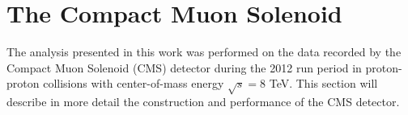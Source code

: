 
\section{The Compact Muon Solenoid}\label{sec:CMS}

The analysis presented in this work was performed on the data recorded by the Compact Muon Solenoid (CMS) detector\cite{CMSatLHC} during the 2012
run period in proton-proton collisions with center-of-mass energy $\sqrt{s} = $8 TeV. This section will describe in more detail 
the construction and performance of the CMS detector.

